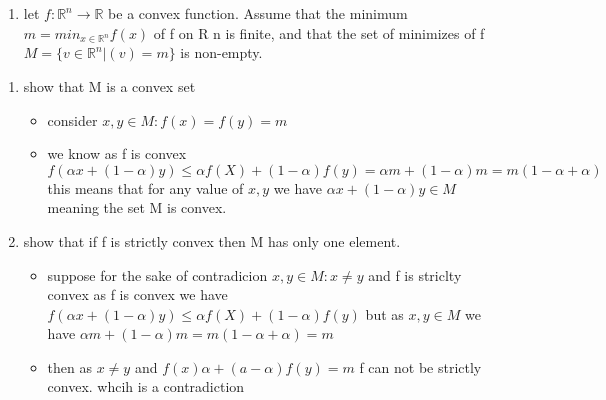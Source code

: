 \documentclass[12pt,twoside]{article}
\begin{document}
\begin{enumerate}[label=9.4]\item let $f:\mathbb{R}^{n}\rightarrow \mathbb{R}$ be a convex function. Assume that the minimum
$m = min_{x\in\mathbb{R}^n}f(x)$ of f on R
n
is finite, and that the set of minimizes of f
$M=\{v\in\mathbb{R}^{n}|(v) = m\}$
is non-empty.
\end{enumerate}
\begin{enumerate}
\begin{enumerate}
    \item show that M is a convex set
    \begin{itemize}
        \item consider $x,y\in M: f(x)=f(y)=m$
        \item we know as f is convex $f(\alpha x+ (1-\alpha)y)\leq \alpha f(X)+(1-\alpha) f(y)=\alpha m +(1-\alpha) m = m(1-\alpha+\alpha)$ this means that for any value of $x,y$ we have $\alpha x+ (1-\alpha)y\in M$ meaning the set M is convex.   
    \end{itemize}
    \item show that if f is strictly convex then M has only one element. 
    \begin{itemize}
    \item suppose for the sake of contradicion $x,y\in M: x\neq y$ and f is striclty convex 
    as f is convex we have $f(\alpha x+ (1-\alpha)y)\leq \alpha f(X)+(1-\alpha) f(y)$ but as $x,y\in M$ we have $\alpha m +(1-\alpha) m = m(1-\alpha+\alpha)=m$
    \item then as $x\neq y$ and $f(x)\alpha+(a-\alpha)f(y)=m$ f can not be strictly convex. whcih is a contradiction
    
\end{itemize}
\end{enumerate}
\end{enumerate}
\end{document}
